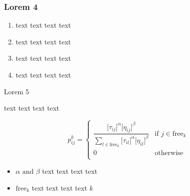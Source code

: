 \documentclass[aspectratio=169]{beamer}
\begin{document}
		\begin{frame}
			\frametitle{Lorem 4}
			\begin{enumerate}
				\item text text text text
				\item text text text text
				\item text text text text
				\item text text text text
			\end{enumerate}
		\end{frame}
	   \begin{frame}{Lorem 5 }
			\begin{block}{text text text text}
				\begin{scriptsize}
					\begin{equation*}
					p_{ij}^k =
					\begin{cases}
					\dfrac{{{[\tau _{ij}}]^\alpha {[\eta _{ij}}]^\beta }}{{\sum\limits_{l
								\in \mbox{free}_{k}} {{[\tau _{il}}]^\alpha {[\eta _{il}}]^\beta } }}
					& \mbox{if } j \in \mbox{free}_{k}\\
					0 & \mbox{otherwise}\\
					\end{cases}
					\end{equation*}
				\end{scriptsize}
			\end{block}
			\begin{itemize}
				\item \(\alpha \mbox{ and } \beta\) text text text text
				\item \(\mbox{free}_{k}\) text text text text \(k\)
			\end{itemize}
		\end{frame}
	
\end{document}
